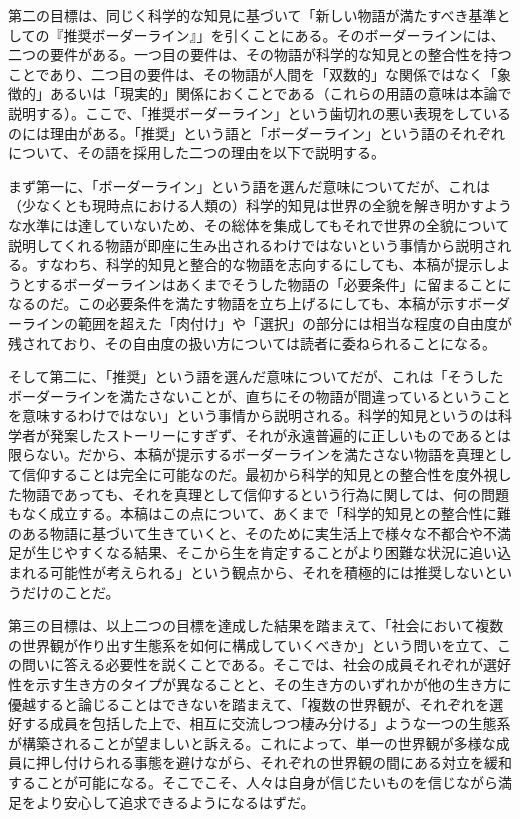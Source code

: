 第二の目標は、同じく科学的な知見に基づいて「新しい物語が満たすべき基準としての『推奨ボーダーライン』」を引くことにある。そのボーダーラインには、二つの要件がある。一つ目の要件は、その物語が科学的な知見との整合性を持つことであり、二つ目の要件は、その物語が人間を「双数的」な関係ではなく「象徴的」あるいは「現実的」関係におくことである（これらの用語の意味は本論で説明する）。ここで、「推奨ボーダーライン」という歯切れの悪い表現をしているのには理由がある。「推奨」という語と「ボーダーライン」という語のそれぞれについて、その語を採用した二つの理由を以下で説明する。

まず第一に、「ボーダーライン」という語を選んだ意味についてだが、これは（少なくとも現時点における人類の）科学的知見は世界の全貌を解き明かすような水準には達していないため、その総体を集成してもそれで世界の全貌について説明してくれる物語が即座に生み出されるわけではないという事情から説明される。すなわち、科学的知見と整合的な物語を志向するにしても、本稿が提示しようとするボーダーラインはあくまでそうした物語の「必要条件」に留まることになるのだ。この必要条件を満たす物語を立ち上げるにしても、本稿が示すボーダーラインの範囲を超えた「肉付け」や「選択」の部分には相当な程度の自由度が残されており、その自由度の扱い方については読者に委ねられることになる。

そして第二に、「推奨」という語を選んだ意味についてだが、これは「そうしたボーダーラインを満たさないことが、直ちにその物語が間違っているということを意味するわけではない」という事情から説明される。科学的知見というのは科学者が発案したストーリーにすぎず、それが永遠普遍的に正しいものであるとは限らない。だから、本稿が提示するボーダーラインを満たさない物語を真理として信仰することは完全に可能なのだ。最初から科学的知見との整合性を度外視した物語であっても、それを真理として信仰するという行為に関しては、何の問題もなく成立する。本稿はこの点について、あくまで「科学的知見との整合性に難のある物語に基づいて生きていくと、そのために実生活上で様々な不都合や不満足が生じやすくなる結果、そこから生を肯定することがより困難な状況に追い込まれる可能性が考えられる」という観点から、それを積極的には推奨しないというだけのことだ。

第三の目標は、以上二つの目標を達成した結果を踏まえて、「社会において複数の世界観が作り出す生態系を如何に構成していくべきか」という問いを立て、この問いに答える必要性を説くことである。そこでは、社会の成員それぞれが選好性を示す生き方のタイプが異なることと、その生き方のいずれかが他の生き方に優越すると論じることはできないを踏まえて、「複数の世界観が、それぞれを選好する成員を包括した上で、相互に交流しつつ棲み分ける」ような一つの生態系が構築されることが望ましいと訴える。これによって、単一の世界観が多様な成員に押し付けられる事態を避けながら、それぞれの世界観の間にある対立を緩和することが可能になる。そこでこそ、人々は自身が信じたいものを信じながら満足をより安心して追求できるようになるはずだ。

